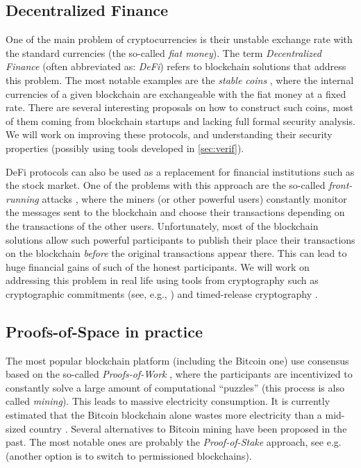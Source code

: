 \documentclass{article}
\begin{document}
\subsection{Decentralized Finance}

One of the main problem of cryptocurrencies is their unstable exchange rate with the standard currencies (the so-called \emph{fiat money}). The term \emph{Decentralized Finance} \cite{enwiki:1030159409} (often abbreviated as: \emph{DeFi}) refers to blockchain solutions that address this problem. The most notable examples are the \emph{stable coins} \cite{Clark2020}, where the internal currencies of a given blockchain are exchangeable with the fiat money at a fixed rate. There are several interesting proposals on how to construct such coins, most of them coming from blockchain startups and lacking full formal security analysis. We will work on improving these protocols, and understanding their security properties (possibly using tools developed in \ref{sec:verif}).
	
DeFi protocols can also be used as a replacement for financial institutions such as the stock market. One of the problems with this approach are the so-called \emph{front-running} attacks \cite{Eskandari2019}, where the miners (or other powerful users) constantly monitor the messages sent to the blockchain and choose their transactions depending on the transactions of the other users. Unfortunately, most of the blockchain solutions allow such powerful participants to publish their place their transactions on the blockchain \emph{before} the original transactions appear there. This can lead to huge financial gains of such of the honest participants. We will work on addressing this problem in real life using tools from cryptography such as cryptographic commitments (see, e.g., \cite{Goldreich2001}) and timed-release cryptography \cite{10.5555/888615}.

\subsection{Proofs-of-Space in practice}\label{sec:PoSpace}

The most popular blockchain platform (including the Bitcoin one) use consensus based on the so-called \emph{Proofs-of-Work} \cite{Dwork1992}, where the participants are incentivized to constantly solve a large amount of computational ``puzzles'' (this process is also called \emph{mining}). This leads to massive electricity consumption. It is currently estimated that the Bitcoin blockchain alone wastes more electricity than a mid-sized country \cite{Criddle}. Several alternatives to Bitcoin mining have been proposed in the past. The most notable ones are probably the \emph{Proof-of-Stake} approach, see e.g.~\cite{Kiayias2017} (another option is to switch to permissioned blockchains).
\end{document}
